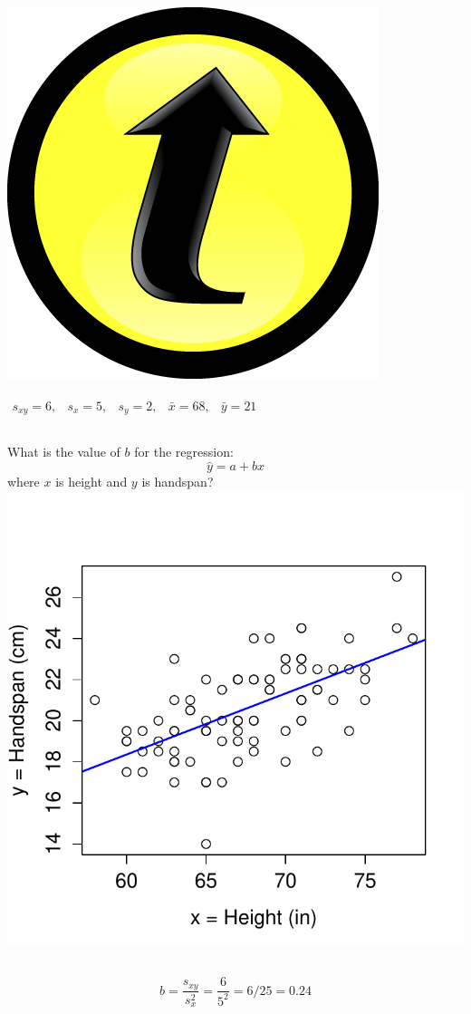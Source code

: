 \documentclass[handout]{beamer}
\begin{document}
\begin{frame}
\frametitle{\includegraphics[scale = 0.05]{./images/clicker}}
$\begin{array}{ccccc} s_{xy} = 6,&s_x = 5,& s_y = 2,& \bar{x} = 68,& \bar{y} = 21\end{array}$
\begin{columns}[c]
\column{2.5in}
What is the value of $b$ for the regression: $$\hat{y}=a+bx$$
where $x$ is height and $y$ is handspan?
\column{1.8in}
\includegraphics[scale = 0.4]{./images/height_handspan2}
\end{columns}
\alert{$$b = \frac{s_{xy}}{s_x^2} = \frac{6}{5^2} = 6/25 = 0.24 $$}
\end{frame}
\end{document}
